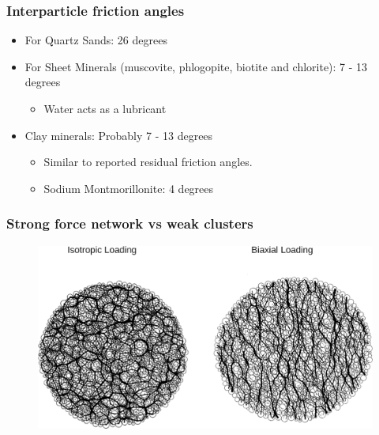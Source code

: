 \documentclass[notes]{beamer}
\begin{document}
\begin{frame}
\frametitle{Interparticle friction angles}
	\begin{itemize}
		\item For Quartz Sands: 26 degrees
		\item  For Sheet Minerals (muscovite, phlogopite, biotite and chlorite): 7 - 13 degrees
		\begin{itemize}
			\item Water acts as a lubricant
		\end{itemize}
		\item Clay minerals: Probably 7 - 13 degrees
		\begin{itemize}
			\item Similar to reported residual friction angles.
			\item Sodium Montmorillonite: 4 degrees
		\end{itemize}
	\end{itemize}
\end{frame}

\begin{frame}
\frametitle{Strong force network vs weak clusters}
\begin{figure}
	\includegraphics[width=\textwidth]{figs/force-network-weak-clusters.png}
\end{figure}
\end{frame}
\end{document}
